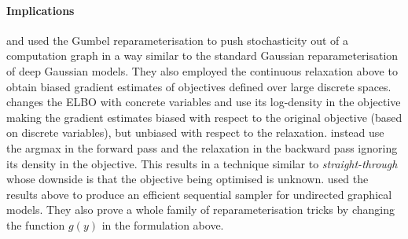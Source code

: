 \documentclass[11pt]{article}
\begin{document}
\paragraph{Implications} \citet{MaddisonEtAl2017:Concrete} and \citet{JangEtAl2017:GumbelSoftmax} used the Gumbel reparameterisation to push stochasticity out of a computation graph in a way similar to the standard Gaussian reparameterisation of deep Gaussian models. They also employed the continuous relaxation above to obtain biased gradient estimates of objectives defined over large discrete spaces.
\citet{MaddisonEtAl2017:Concrete} changes the ELBO with concrete variables and use its log-density in the objective making the gradient estimates biased with respect to the original objective (based on discrete variables), but unbiased with respect to the relaxation. 
\citet{JangEtAl2017:GumbelSoftmax} instead use the argmax in the forward pass and the relaxation in the backward pass ignoring its density in the objective. This results in a technique similar to \emph{straight-through} \citep{BengioEtAl2013:ST} whose downside is that the objective being optimised is unknown. \citet{BalogEtAl2017:Gumbel} used the results above to produce an efficient sequential sampler for undirected graphical models. They also prove a whole family of reparameterisation tricks by changing the function $g(y)$ in the formulation above. 





\end{document}

